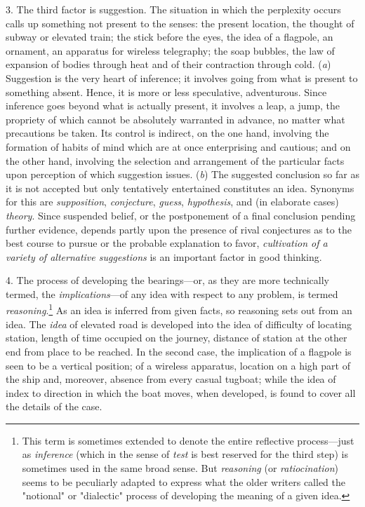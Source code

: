 \documentclass[showtrims,ustradepaper]{memoir}
\begin{document}
3. The third factor is suggestion. The situation
in
which the perplexity occurs calls up something not present to the
senses: the present location, the thought of subway or elevated train;
the stick before the eyes, the idea of a flagpole, an ornament, an
apparatus for wireless telegraphy; the soap bubbles, the law of
expansion of bodies through heat and of their contraction through cold.
(\emph{a}) Suggestion is the very heart of inference; it involves going
from what is present to something absent. Hence, it is more or less
speculative, adventurous. Since inference goes beyond what is actually
present, it involves a leap, a jump, the propriety of which cannot be
absolutely warranted in advance, no matter what precautions be taken.
Its control is indirect, on the one hand, involving the formation of
habits of mind which are at once enterprising and cautious; and on the
other hand, involving the selection and arrangement of the particular
facts upon perception of which suggestion issues. (\emph{b}) The
suggested conclusion so far as it is not accepted but only tentatively
entertained constitutes an idea. Synonyms for this are
\emph{supposition}, \emph{conjecture}, \emph{guess}, \emph{hypothesis},
and (in elaborate cases) \emph{theory}. Since suspended belief, or the
postponement of a final conclusion pending further evidence, depends
partly upon the presence of rival conjectures as to the best course to
pursue or the probable explanation to favor, \emph{cultivation of a
variety of alternative suggestions} is an important factor in good
thinking.


4. The process of developing the bearings---or, as they are more
technically termed, the \emph{implications}---of any idea with respect
to any problem, is termed
\emph{reasoning}.\footnote{
This term is sometimes extended to denote the entire reflective
process---just as \emph{inference} (which in the sense of \emph{test} is
best reserved for the third step) is sometimes used in the same broad
sense. But \emph{reasoning} (or \emph{ratiocination}) seems to be
peculiarly adapted to express what the older writers called the
"notional" or "dialectic" process of developing the meaning of a given
idea.
}
As an idea is inferred from given facts, so
reasoning
sets out from an idea. The \emph{idea} of elevated road is developed
into the idea of difficulty of locating station, length of time occupied
on the journey, distance of station at the other end from place to be
reached. In the second case, the implication of a flagpole is seen to be
a vertical position; of a wireless apparatus, location on a high part of
the ship and, moreover, absence from every casual tugboat; while the
idea of index to direction in which the boat moves, when developed, is
found to cover all the details of the case.
\end{document}
